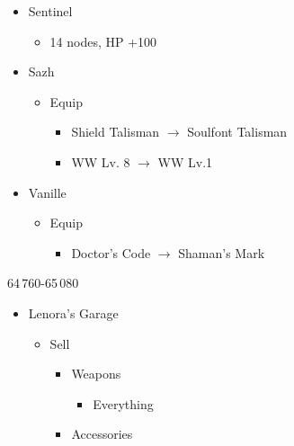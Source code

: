 \begin{multicols}{2}
\begin{menu}
\begin{itemize}
\begin{itemize}
\begin{itemize}
					      \item Sentinel
					            \begin{itemize}
						            \item 14 nodes, HP +100
					            \end{itemize}
				      \end{itemize}
			\end{itemize}
			\equip
			\begin{itemize}
				\item Sazh
				      \begin{itemize}
					      \item Equip
					            \begin{itemize}
						            \item Shield Talisman $\rightarrow$ Soulfont Talisman
						            \item WW Lv. 8 $\rightarrow$ WW Lv.1
					            \end{itemize}
				      \end{itemize}
				\item Vanille
				      \begin{itemize}
					      \item Equip
					            \begin{itemize}
						            \item Doctor's Code $\rightarrow$ Shaman's Mark
					            \end{itemize}
				      \end{itemize}
			\end{itemize}
		\end{itemize}
	\end{menu}
	\begin{shop}{64\,760-65\,080}
		\begin{itemize}
			\item Lenora's Garage
			      \begin{itemize}
				      \item Sell
				            \begin{itemize}
					            \item Weapons
					                  \begin{itemize}
						                  \item Everything
					                  \end{itemize}
					            \item Accessories
					                  \begin{itemize}

\end{itemize}
\end{itemize}
\end{itemize}
\end{itemize}
\end{shop}
\end{multicols}

